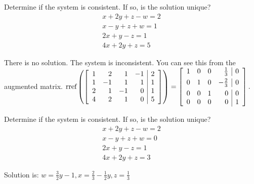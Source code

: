 \documentclass{ximera}
\begin{document}
\begin{problem}\label{prb:2.15}
Determine if the system is consistent. If so, is the solution unique?
\begin{equation*}
\begin{array}{c}
x+2y+z-w=2 \\
x-y+z+w=1 \\
2x+y-z=1 \\
4x+2y+z=5
\end{array}
\end{equation*}
\begin{hint}
There is no solution. The system is inconsistent. You can see this from the
augmented matrix. $\mbox{rref}\left(\left[
\begin{array}{rrrr|r}
1 & 2 & 1 & -1 & 2 \\
1 & -1 & 1 & 1 & 1 \\
2 & 1 & -1 & 0 & 1 \\
4 & 2 & 1 & 0 & 5
\end{array}
\right]\right) = \left[
\begin{array}{rrrr|r}
1 & 0 & 0 & \vspace{0.05in}\frac{1}{3} & 0 \\
0 & 1 & 0 & -\vspace{0.05in}\frac{2}{3} & 0 \\
0 & 0 & 1 & 0 & 0 \\
0 & 0 & 0 & 0 & 1
\end{array}
\right] .$
\end{hint}
\end{problem}

\begin{problem}\label{prb:2.16}
Determine if the system is consistent. If so, is the solution unique?
\begin{equation*}
\begin{array}{c}
x+2y+z-w=2 \\
x-y+z+w=0 \\
2x+y-z=1 \\
4x+2y+z=3
\end{array}
\end{equation*}
\begin{hint}
Solution is: $ w=\frac{3}{2}y-1, x=\frac{2}{3}-\frac{1}{2}y, z=\frac{1}{3} $
\end{hint}
\end{problem}
\end{document}
